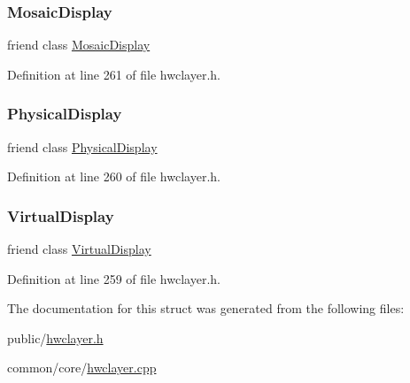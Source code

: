 \subsubsection{\texorpdfstring{Mosaic\+Display}{MosaicDisplay}}
{\footnotesize\ttfamily friend class \mbox{\hyperlink{classhwcomposer_1_1MosaicDisplay}{Mosaic\+Display}}\hspace{0.3cm}{\ttfamily [friend]}}



Definition at line 261 of file hwclayer.\+h.

\mbox{\label{structhwcomposer_1_1HwcLayer_a3e381d9464ef96b091fe38d2919fda4a}} 
\subsubsection{\texorpdfstring{Physical\+Display}{PhysicalDisplay}}
{\footnotesize\ttfamily friend class \mbox{\hyperlink{classhwcomposer_1_1PhysicalDisplay}{Physical\+Display}}\hspace{0.3cm}{\ttfamily [friend]}}



Definition at line 260 of file hwclayer.\+h.

\mbox{\label{structhwcomposer_1_1HwcLayer_a95c8d2c73f3d42e358849aecbd0d691a}} 
\subsubsection{\texorpdfstring{Virtual\+Display}{VirtualDisplay}}
{\footnotesize\ttfamily friend class \mbox{\hyperlink{classhwcomposer_1_1VirtualDisplay}{Virtual\+Display}}\hspace{0.3cm}{\ttfamily [friend]}}



Definition at line 259 of file hwclayer.\+h.



The documentation for this struct was generated from the following files\+:\begin{DoxyCompactItemize}
\item 
public/\mbox{\hyperlink{hwclayer_8h}{hwclayer.\+h}}\item 
common/core/\mbox{\hyperlink{hwclayer_8cpp}{hwclayer.\+cpp}}\end{DoxyCompactItemize}
